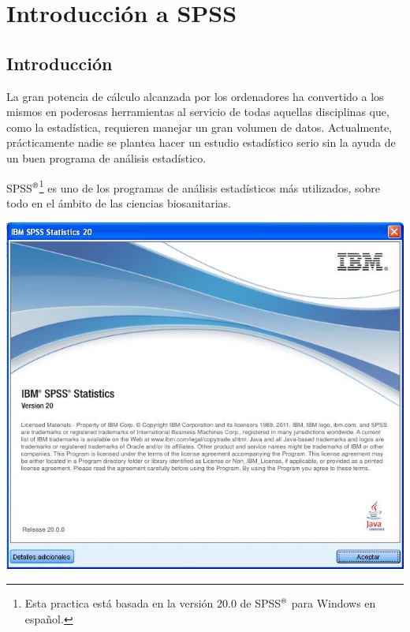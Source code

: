 
\chapter{Introducción a SPSS}

\section{Introducción}
La gran potencia de cálculo alcanzada por los ordenadores ha convertido a los mismos en poderosas herramientas al servicio de todas aquellas disciplinas que, como la estadística, requieren manejar un gran volumen de datos.
Actualmente, prácticamente nadie se plantea hacer un estudio estadístico serio sin la ayuda de un buen programa de análisis estadístico.

SPSS$^{\textsf{\textregistered}}$\renewcommand{\thefootnote}{\fnsymbol{footnote}}\footnote{Esta practica está basada en la versión 20.0 de SPSS$^{\textsf{\textregistered}}$ para Windows en español.} es uno de los programas de análisis estadísticos más utilizados, sobre todo en el ámbito de las ciencias biosanitarias.
\begin{center}
\includegraphics[scale=0.5]{introduccion_spss/img/portada}
\end{center}


